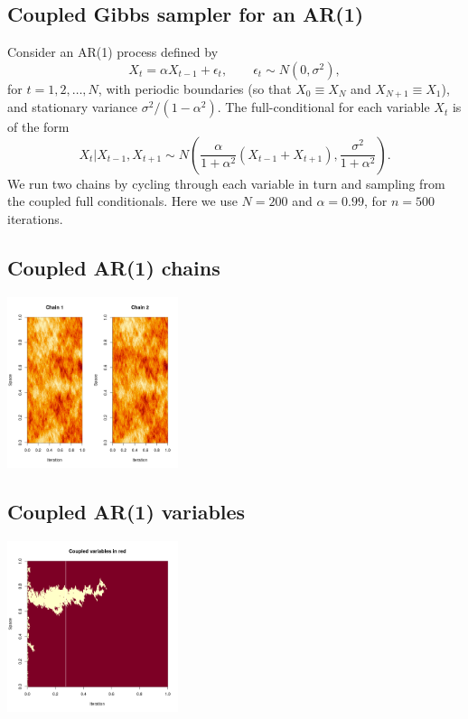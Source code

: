 \documentclass[11pt,a4paper]{article}
\begin{document}
\subsection{Coupled Gibbs sampler for an AR(1)}
Consider an AR(1) process defined by
$$
X_t = \alpha X_{t-1} + \epsilon_t,\qquad \epsilon_t \sim N(0,\sigma^2),
$$
for $t=1,2,\ldots,N$, with periodic boundaries (so that $X_0\equiv X_N$ and $X_{N+1}\equiv X_1$), and stationary variance $\sigma^2/(1-\alpha^2)$. The full-conditional for each variable $X_t$ is of the form
$$
X_t|X_{t-1},X_{t+1} \sim N\left(\frac{\alpha}{1+\alpha^2}(X_{t-1}+X_{t+1}), \frac{\sigma^2}{1+\alpha^2} \right).
$$
We run two chains by cycling through each variable in turn and sampling from the coupled full conditionals. Here we use $N=200$ and $\alpha=0.99$, for $n=500$ iterations.



  \subsection{Coupled AR(1) chains}
\centerline{\includegraphics[height=5cm]{figs/ar1-chains}}



  \subsection{Coupled AR(1) variables}
\centerline{\includegraphics[height=5cm]{figs/ar1-coupled-1}}
\end{document}
